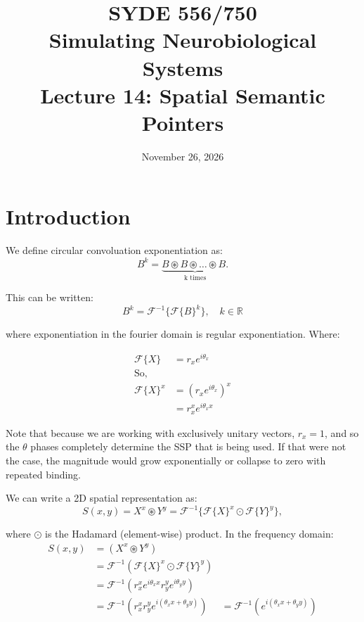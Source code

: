 \documentclass[10pt,letterpaper,oneside]{article}
\date{November 26, 2026}
\title{SYDE 556/750 \\ Simulating Neurobiological Systems \\ Lecture 14: Spatial Semantic Pointers}
\begin{document}

\section{Introduction}


We define circular convoluation exponentiation as: 
\begin{equation}
  B^k = \underbrace{B \circledast B \circledast \dots \circledast B. }_{\text{k times}}
\end{equation}

This can be written: 
\begin{equation}
  B^k = \mathcal{F}^{-1}\{\mathcal{F}\{B\}^k\}, \quad k \in \mathbb{R}
\end{equation}

where exponentiation in the fourier domain is regular exponentiation.  Where: 

\begin{align}
  \mathcal{F}\{ X\} &= r_{x} e^{i \theta_{x}} \\
  \textrm{So,}\\
  \mathcal{F}\{ X\}^x &= \left( r_{x} e^{i \theta_{x}} \right)^x \\
  &= r_{x}^x e^{i \theta_{x} x} 
\end{align}

Note that because we are working with exclusively unitary vectors, $r_x = 1$, and so the $\theta$ phases completely determine the SSP that is being used. If that were not the case, the magnitude would grow exponentially or collapse to zero with repeated binding.

We can write a 2D spatial representation as: 
\begin{equation}
  S(x,y) = X^x \circledast Y^y = \mathcal{F}^{-1}\{\mathcal{F}\{X\}^x\odot\mathcal{F} \{Y\}^y\},
\end{equation}

where $\odot$ is the Hadamard (element-wise) product. In the frequency domain: 
\begin{align}
  S(x, y) &= (X^{x} \circledast Y^{y}) \\
   &= \mathcal{F}^{-1}( \mathcal{F}\{ X\}^{x} \odot \mathcal{F}\{ Y\}^{y} ) \\
   &=  \mathcal{F}^{-1}(r_{x}^x e^{ i \theta_{x} x} r_{y}^y  e^{i \theta_{y} y })\\
   &=  \mathcal{F}^{-1}(r_{x}^x r_{y}^y e^{ i(\theta_{x} x + \theta_{y} y )})
   &=  \mathcal{F}^{-1}(e^{ i(\theta_{x} x + \theta_{y} y )})
\end{align}
\end{document}
